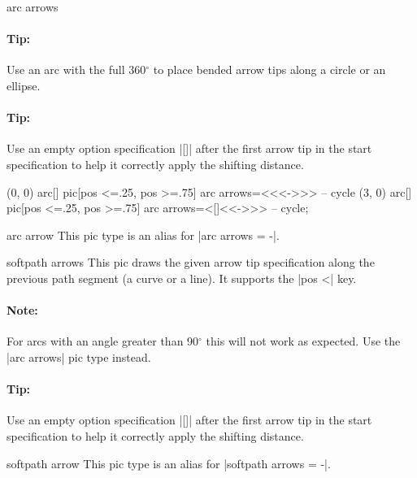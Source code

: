 \begin{multicols}{2}
\begin{pictype}{arc arrows}{}
\paragraph{Tip:}
Use an arc with the full 360${}^\circ$ to place bended arrow tips along a circle or an ellipse.
\paragraph{Tip:}
Use an empty option specification |[]| after the first arrow tip in the start specification
to help it correctly apply the shifting distance.
\begin{codeexample}[preamble=\usetikzlibrary{bending, ext.arrows-plus}]
\tikz[>={Stealth[color=red, round]}, arrows={[bend]}, ultra thick]
  \draw[start angle=0, end angle=360, radius=1]
    (0, 0) arc[] pic[pos <=.25, pos >=.75] {arc arrows=<<<->>>}   -- cycle
    (3, 0) arc[] pic[pos <=.25, pos >=.75] {arc arrows=<[]<<->>>} -- cycle;
\end{codeexample}
\end{pictype}

\begin{pictype}{arc arrow}{}
  This pic type is an alias for |arc arrows = -|.
\end{pictype}

\begin{pictype}{softpath arrows}{}
  This pic draws the given arrow tip specification along the previous path segment (a curve or a line).
  It supports the |pos <| key.
  
  \paragraph{Note:} For arcs with an angle greater than 90${}^\circ$
    this will not work as expected. Use the |arc arrows| pic type instead.
  \paragraph{Tip:}
  Use an empty option specification |[]| after the first arrow tip in the start specification
  to help it correctly apply the shifting distance.
\end{pictype}
\begin{pictype}{softpath arrow}{}
  This pic type is an alias for |softpath arrows = -|.
\end{pictype}


\end{multicols}
